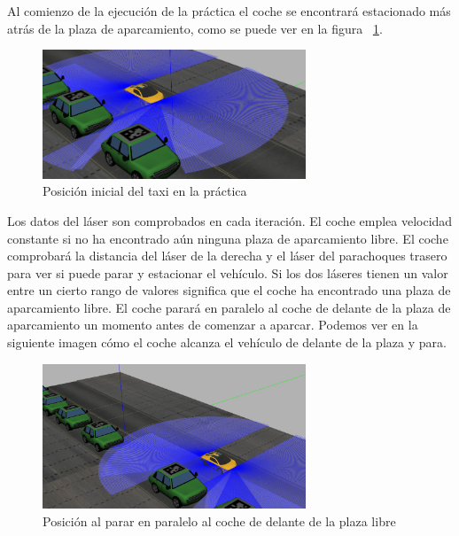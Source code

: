 Al comienzo de la ejecución de la práctica el coche se encontrará estacionado más atrás de la plaza de aparcamiento, como se puede ver en la figura ~\ref{fig.Posicion1}.

\begin{figure}[H]
  \begin{center}
    \includegraphics[width=0.7\textwidth]{figures/Autopark/Posicion1.png}
		\caption{Posición inicial del taxi en la práctica}
		\label{fig.Posicion1}
		\end{center}
\end{figure}

Los datos del láser son comprobados en cada iteración. El coche emplea velocidad constante si no ha encontrado aún ninguna plaza de aparcamiento libre. El coche comprobará la distancia del láser de la derecha y el láser del parachoques trasero para ver si puede parar y estacionar el vehículo. Si los dos láseres tienen un valor entre un cierto rango de valores significa que el coche ha encontrado una plaza de aparcamiento libre. El coche parará en paralelo al coche de delante de la plaza de aparcamiento un momento antes de comenzar a aparcar. Podemos ver en la siguiente imagen cómo el coche alcanza el vehículo de delante de la plaza y para.

\begin{figure}[H]
  \begin{center}
    \includegraphics[width=0.7\textwidth]{figures/Autopark/Posicion2.png}
		\caption{Posición al parar en paralelo al coche de delante de la plaza libre}
		\label{fig.Posicion2}
		\end{center}
\end{figure}

